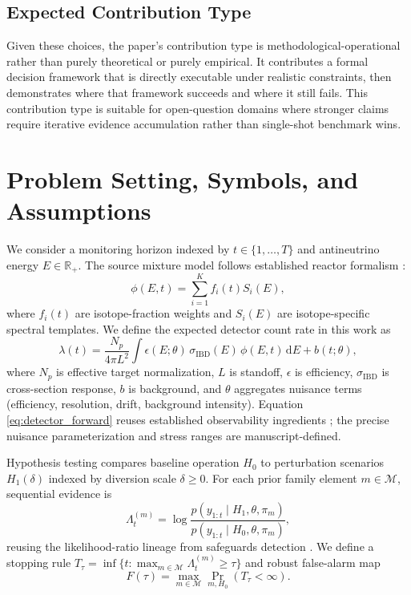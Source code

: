 \subsection{Expected Contribution Type}
Given these choices, the paper's contribution type is methodological-operational rather than purely theoretical or purely empirical. It contributes a formal decision framework that is directly executable under realistic constraints, then demonstrates where that framework succeeds and where it still fails. This contribution type is suitable for open-question domains where stronger claims require iterative evidence accumulation rather than single-shot benchmark wins.

\section{Problem Setting, Symbols, and Assumptions}\label{sec:problem_setting}
We consider a monitoring horizon indexed by $t\in\{1,\dots,T\}$ and antineutrino energy $E\in\mathbb{R}_+$. The source mixture model follows established reactor formalism \citep{SRC014,SRC030}:
\begin{equation}
\phi(E,t)=\sum_{i=1}^{K} f_i(t) S_i(E),
\label{eq:source_mixture}
\end{equation}
where $f_i(t)$ are isotope-fraction weights and $S_i(E)$ are isotope-specific spectral templates. We define the expected detector count rate in this work as
\begin{equation}
\lambda(t)=\frac{N_p}{4\pi L^2}\int \epsilon(E;\theta)\,\sigma_{\mathrm{IBD}}(E)\,\phi(E,t)\,\mathrm{d}E + b(t;\theta),
\label{eq:detector_forward}
\end{equation}
where $N_p$ is effective target normalization, $L$ is standoff, $\epsilon$ is efficiency, $\sigma_{\mathrm{IBD}}$ is cross-section response, $b$ is background, and $\theta$ aggregates nuisance terms (efficiency, resolution, drift, background intensity). Equation \eqref{eq:detector_forward} reuses established observability ingredients \citep{SRC023,SRC009,SRC001}; the precise nuisance parameterization and stress ranges are manuscript-defined.

Hypothesis testing compares baseline operation $H_0$ to perturbation scenarios $H_1(\delta)$ indexed by diversion scale $\delta\ge 0$. For each prior family element $m\in\mathcal{M}$, sequential evidence is
\begin{equation}
\Lambda_t^{(m)} = \log\frac{p(y_{1:t}\mid H_1,\theta,\pi_m)}{p(y_{1:t}\mid H_0,\theta,\pi_m)},
\label{eq:sequential_lr}
\end{equation}
reusing the likelihood-ratio lineage from safeguards detection \citep{SRC009,SRC017}. We define a stopping rule $T_\tau=\inf\{t: \max_{m\in\mathcal{M}}\Lambda_t^{(m)}\ge \tau\}$ and robust false-alarm map
\begin{equation}
F(\tau)=\max_{m\in\mathcal{M}}\Pr_{m,H_0}(T_\tau<\infty).
\label{eq:far_map}
\end{equation}

